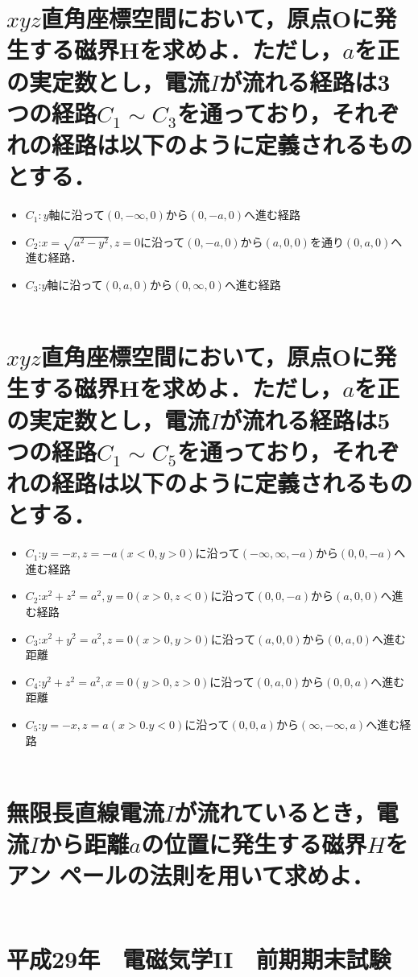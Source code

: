 \documentclass[dvipdfmx]{ujarticle}
\begin{document}
\section{$xyz$直角座標空間において，原点Oに発生する磁界$\boldsymbol{H}$を求めよ．ただし，$a$を正の実定数とし，電流$I$が流れる経路は3つの経路$C_{1}\sim C_{3}$を通っており，それぞれの経路は以下のように定義されるものとする．}
\begin{itemize}
	\item $C_{1}:$$y$軸に沿って$(0, -\infty, 0)$から$(0, -a, 0)$へ進む経路
	\item $C_{2}$:$x=\sqrt{a^{2}-y^{2}}, z=0$に沿って$(0, -a, 0)$から$(a, 0, 0)$を通り$(0, a, 0)$へ進む経路．
	\item $C_{3}$:$y$軸に沿って$(0, a, 0)$から$(0, \infty, 0)$へ進む経路
\end{itemize}
\begin{align*}
\end{align*}

\section{$xyz$直角座標空間において，原点Oに発生する磁界$\boldsymbol{H}$を求めよ．ただし，$a$を正の実定数とし，電流$I$が流れる経路は5つの経路$C_{1}\sim C_{5}$を通っており，それぞれの経路は以下のように定義されるものとする．}
\begin{itemize}
	\item $C_{1}$:$y=-x,z=-a(x<0, y>0)$に沿って$(-\infty, \infty, -a)$から$(0, 0, -a)$へ進む経路
	\item $C_{2}$:$x^{2}+z^{2}=a^{2},y=0(x>0, z<0)$に沿って$(0, 0, -a)$から$(a, 0, 0)$へ進む経路
	\item $C_{3}$:$x^{2}+y^{2}=a^{2},z=0(x>0, y>0)$に沿って$(a, 0, 0)$から$(0, a, 0)$へ進む距離
	\item $C_{4}$:$y^{2}+z^{2}=a^{2},x=0(y>0, z>0)$に沿って$(0, a, 0)$から$(0, 0, a)$へ進む距離
	\item $C_{5}$:$y=-x, z=a(x>0. y<0)$に沿って$(0, 0, a)$から$(\infty, -\infty, a)$へ進む経路
\end{itemize}
\begin{align*}
\end{align*}

\section{無限長直線電流$I$が流れているとき，電流$I$から距離$a$の位置に発生する磁界$H$をアン
ペールの法則を用いて求めよ．}
\begin{align*}
\end{align*}

\clearpage
\setcounter{section}{0}
\section*{平成29年　電磁気学II　前期期末試験}
\end{document}
